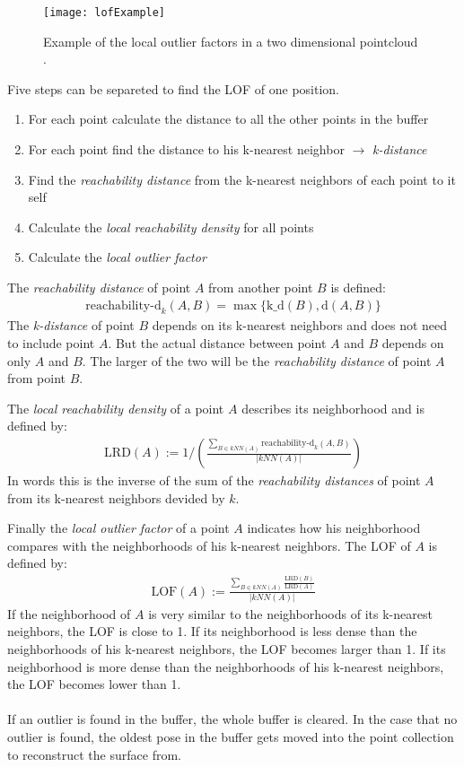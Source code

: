 \begin{figure}[H]
  \centering
 \texttt{[image: lofExample]}
  \caption{Example of the local outlier factors in a two dimensional pointcloud \cite{pictureLOF}.}
  \label{fig:lofExample}
\end{figure}

Five steps can be separeted to find the LOF of one position.
\begin{enumerate}
  \item{For each point calculate the distance to all the other points in the buffer}
  \item{For each point find the distance to his k-nearest neighbor $\rightarrow$
      \textit{k-distance}}
  \item{Find the \textit{reachability distance} from the k-nearest neighbors
      of each point to it self}
  \item{Calculate the \textit{local reachability density} for all points}
  \item{Calculate the \textit{local outlier factor}}
\end{enumerate}
The \textit{reachability distance} of point $A$ from another point $B$ is defined:
\begin{gather*}
  \mbox{reachability-d}_k(A,B)=\max\{\mbox{k\_d}(B), \mbox{d}(A,B)\}
\end{gather*}
The \textit{k-distance} of point $B$ depends on its k-nearest neighbors
and does not need to include point $A$.
But the actual distance between point $A$ and $B$ depends on only $A$
and $B$. The larger of the two will be the \textit{reachability distance} of
point $A$ from point $B$.

The \textit{local reachability density} of a point $A$ describes its neighborhood
and is defined by:
\begin{gather*}
  \mbox{LRD}(A):=1/\left(\frac{\sum_{B\in kNN(A)}\mbox{reachability-d}_k(A, B)}{|kNN(A)|}\right)
\end{gather*}
In words this is the inverse of the sum of the \textit{reachability distances} of point $A$
from its k-nearest neighbors devided by $k$.

Finally the \textit{local outlier factor} of a point $A$ indicates how his
neighborhood compares with the neighborhoods of his k-nearest neighbors. The LOF
of $A$ is defined by:
\begin{gather*}
  \mbox{LOF}(A):=\frac{\sum_{B\in kNN(A)}\frac{\mbox{LRD}(B)}{\mbox{LRD}(A)}}{|kNN(A)|}
\end{gather*}
If the neighborhood of $A$ is very similar to the neighborhoods of its k-nearest
neighbors, the LOF is close to 1. If its neighborhood is less dense than the
neighborhoods of his k-nearest neighbors, the LOF becomes larger than 1. If its
neighborhood is more dense than the neighborhoods of his k-nearest neighbors,
the LOF becomes lower than 1. \\
 \\
If an outlier is found in the buffer, the whole buffer is cleared. In the case
that no outlier is found, the oldest pose in the buffer gets moved into the
point collection to reconstruct the surface from.
